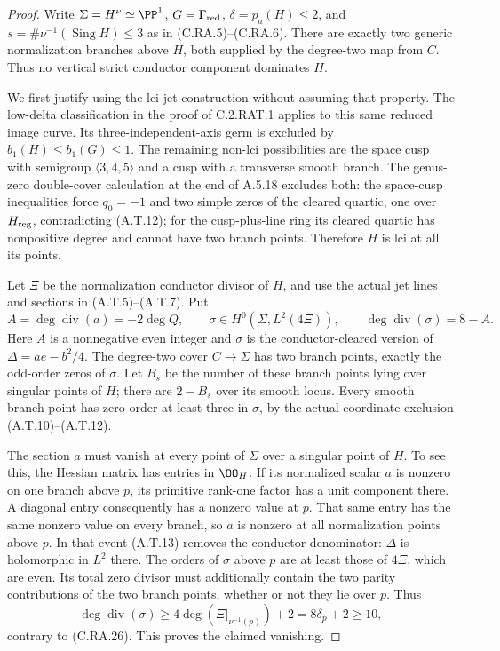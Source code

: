 \begin{proof}
Write $\Sigma=H^\nu\simeq\PP^1$, $G=\Gamma_{\rm red}$,
$\delta=p_a(H)\le2$, and
$s=\#\nu^{-1}(\operatorname{Sing}H)\le3$ as in
(C.RA.5)--(C.RA.6). There are exactly two generic
normalization branches above $H$, both supplied by the
degree-two map from $C$. Thus no vertical strict conductor
component dominates $H$.

We first justify using the lci jet construction without
assuming that property. The low-delta classification in the
proof of C.2.RAT.1 applies to this same reduced image curve.
Its three-independent-axis germ is excluded by
$b_1(H)\le b_1(G)\le1$. The remaining non-lci possibilities
are the space cusp with semigroup $\langle3,4,5\rangle$
and a cusp with a transverse smooth branch. The
genus-zero double-cover calculation at the end of A.5.18
excludes both: the space-cusp inequalities force
$q_0=-1$ and two simple zeros of the cleared quartic,
one over $H_{\rm reg}$, contradicting (A.T.12); for the
cusp-plus-line ring its cleared quartic has nonpositive
degree and cannot have two branch points. Therefore $H$
is lci at all its points.

Let $\Xi$ be the normalization conductor divisor of $H$,
and use the actual jet lines and sections in
(A.T.5)--(A.T.7). Put
\[
 A=\deg\operatorname{div}(a)=-2\deg Q,\qquad
 \sigma\in H^0(\Sigma,L^2(4\Xi)),\qquad
 \deg\operatorname{div}(\sigma)=8-A.
\tag{C.RA.26}
\]
Here $A$ is a nonnegative even integer and $\sigma$ is
the conductor-cleared version of $\Delta=ae-b^2/4$.
The degree-two cover $C\to\Sigma$ has two branch points,
exactly the odd-order zeros of $\sigma$. Let $B_s$ be
the number of these branch points lying over singular
points of $H$; there are $2-B_s$ over its smooth locus.
Every smooth branch point has zero order at least three
in $\sigma$, by the actual coordinate exclusion
(A.T.10)--(A.T.12).

The section $a$ must vanish at every point of $\Sigma$
over a singular point of $H$. To see this, the Hessian
matrix has entries in $\OO_H$. If its normalized scalar
$a$ is nonzero on one branch above $p$, its primitive
rank-one factor has a unit component there. A diagonal
entry consequently has a nonzero value at $p$. That
same entry has the same nonzero value on every branch,
so $a$ is nonzero at all normalization points above $p$.
In that event (A.T.13) removes the conductor denominator:
$\Delta$ is holomorphic in $L^2$ there. The orders of
$\sigma$ above $p$ are at least those of $4\Xi$,
which are even. Its total zero divisor must additionally
contain the two parity contributions of the two branch
points, whether or not they lie over $p$. Thus
\[
 \deg\operatorname{div}(\sigma)
       \ge4\deg(\Xi|_{\nu^{-1}(p)})+2
       =8\delta_p+2\ge10,
\tag{C.RA.27}
\]
contrary to (C.RA.26). This proves the claimed vanishing.


\end{proof}
